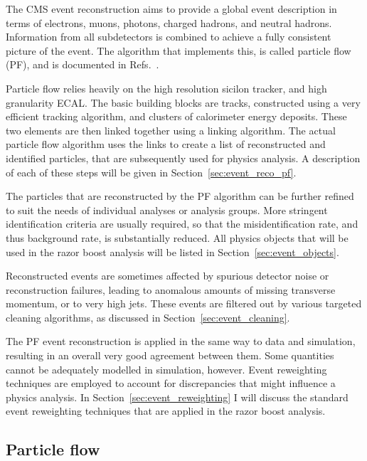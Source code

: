 
The CMS event reconstruction aims to provide a global event description in terms of electrons,
muons, photons, charged hadrons, and neutral hadrons. Information from all subdetectors is combined
to achieve a fully consistent picture of the event. The algorithm that implements this, is called
particle flow (PF), and is documented in Refs.~\cite{CMS-PAS-PFT-09-001,PF}. 

Particle flow relies heavily on the high resolution sicilon tracker, and high granularity ECAL. The
basic building blocks are tracks, constructed using a very efficient tracking algorithm, and
clusters of calorimeter energy deposits. 
These two elements are then linked together using a linking algorithm. The actual particle flow
algorithm uses the links to create a list of reconstructed and identified particles, that are
subsequently used for physics analysis. A description of each of these steps will be given in
Section~\ref{sec:event_reco_pf}.

The particles that are reconstructed by the PF algorithm can be further refined to suit the needs
of individual analyses or analysis groups. More stringent identification criteria are usually
required, so that the misidentification rate, and thus background rate, is substantially reduced.
All physics objects that will be used in the razor boost analysis will be listed in
Section~\ref{sec:event_objects}.

Reconstructed events are sometimes affected by spurious detector noise or reconstruction failures,
leading to anomalous amounts of missing transverse momentum, or to very high \pt jets. 
These events are filtered out by various targeted cleaning algorithms, as discussed in
Section~\ref{sec:event_cleaning}.

The PF event reconstruction is applied in the same way to data and simulation, resulting in an
overall very good agreement between them. Some quantities cannot be adequately modelled in
simulation, however. Event reweighting techniques are employed to account for discrepancies that
might influence a physics analysis. In Section~\ref{sec:event_reweighting} I will discuss the
standard event reweighting techniques that are applied in the razor boost analysis. 


\subsection{Particle flow \label{sec:event_reco_pf}}


